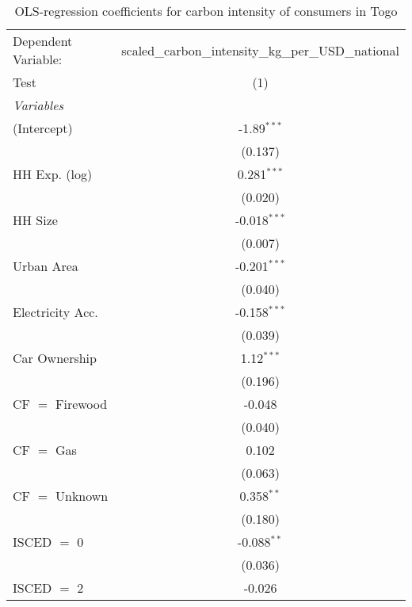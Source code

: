
\begin{table}[htbp!]
   \centering
   \small
   \begin{adjustbox}{width = 1\textwidth, max height = 0.95\textheight, center}
      \begin{threeparttable}[b]
         \caption{\label{tab:OLS_1_TGO} OLS-regression coefficients for carbon intensity of consumers in Togo}
         \begin{tabular}{lc}
            \tabularnewline \midrule \midrule
            Dependent Variable: & scaled\_carbon\_intensity\_kg\_per\_USD\_national\\        
            Test                & (1)\\  
            \midrule
            \emph{Variables}\\
            (Intercept)         & -1.89$^{***}$\\   
                                & (0.137)\\   
            HH Exp. (log)       & 0.281$^{***}$\\   
                                & (0.020)\\   
            HH Size             & -0.018$^{***}$\\   
                                & (0.007)\\   
            Urban Area          & -0.201$^{***}$\\   
                                & (0.040)\\   
            Electricity Acc.    & -0.158$^{***}$\\   
                                & (0.039)\\   
            Car Ownership       & 1.12$^{***}$\\   
                                & (0.196)\\   
            CF $=$ Firewood     & -0.048\\   
                                & (0.040)\\   
            CF $=$ Gas          & 0.102\\   
                                & (0.063)\\   
            CF $=$ Unknown      & 0.358$^{**}$\\   
                                & (0.180)\\   
            ISCED $=$ 0         & -0.088$^{**}$\\   
                                & (0.036)\\   
            ISCED $=$ 2         & -0.026\\   

\end{tabular}
\end{threeparttable}
\end{adjustbox}
\end{table}
